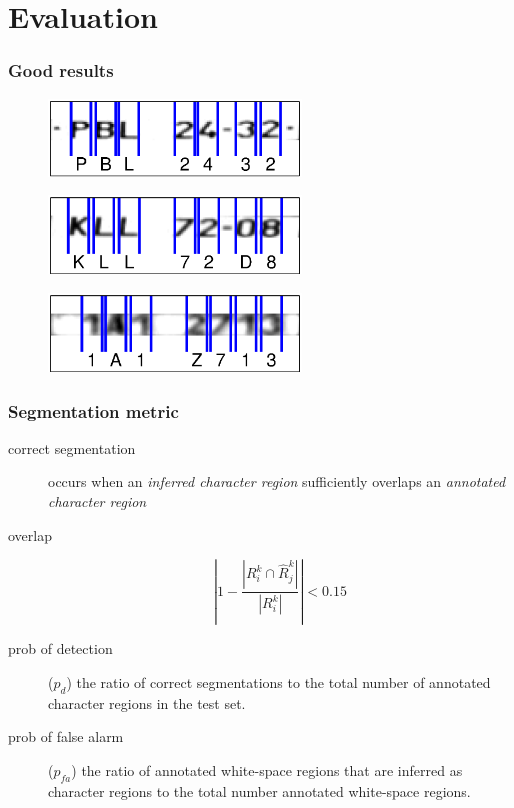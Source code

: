\documentclass{beamer}
\begin{document}
\section{Evaluation}
\begin{frame}
  \frametitle{Good results}

\begin{figure}
  \centering
  \includegraphics[width=0.6\textwidth]{pics/lic_PBL2432.eps}          
\end{figure}  
  
\begin{figure}
  \centering
  \includegraphics[width=0.6\textwidth]{pics/lic_KLL72D8.eps}
\end{figure}  

\begin{figure}
  \centering
  \includegraphics[width=0.6\textwidth]{pics/lic_1A1Z713.eps}
\end{figure}    
  
\end{frame}

\begin{frame}
  \frametitle{Segmentation metric}
\begin{description}
\item[correct segmentation] occurs when an \emph{inferred character
  region} sufficiently overlaps an \emph{annotated character region}
\item[overlap]
\[
\left|1-\frac{|R^k_i \cap \hat{R}^k_j|}{|R^k_i|}\right| < 0.15
\]   
\item[prob of detection] ($p_d$) the ratio of correct segmentations to
  the total number of annotated character regions in the test set.
\item[prob of false alarm] ($p_{fa}$) the ratio of annotated
  white-space regions that are inferred as character regions to the
  total number annotated white-space regions.
\end{description}
\end{frame}
\end{document}
